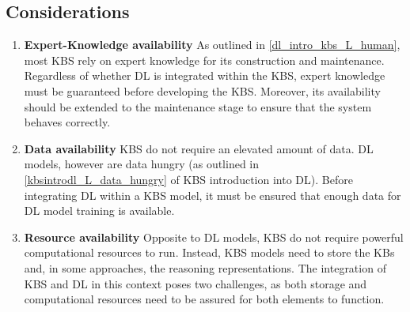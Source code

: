 \subsection{Considerations}
\begin{enumerate} [start=1,label={\bfseries C\arabic*.}]
    \item \textbf{Expert-Knowledge availability}\label{dlintrokbs_C_expert} As outlined in \ref{dl_intro_kbs_L_human}, most KBS rely on expert knowledge for its construction and maintenance. Regardless of whether DL is integrated within the KBS, expert knowledge must be guaranteed before developing the KBS. Moreover, its availability should be extended to the maintenance stage to ensure that the system behaves correctly.
    
    \item \textbf{Data availability}\label{dlintrokbs_C_data} KBS do not require an elevated amount of data. DL models, however are data hungry (as outlined in \ref{kbsintrodl_L_data_hungry} of KBS introduction into DL). Before integrating DL within a KBS model, it must be ensured that enough data for DL model training is available. 
    
    \item \textbf{Resource availability}\label{dlintrokbs_C_resource} Opposite to DL models, KBS do not require powerful computational resources to run. Instead, KBS models need to store the KBs and, in some approaches, the reasoning representations. The integration of KBS and DL in this context poses two challenges, as both storage and computational resources need to be assured for both elements to function.
\end{enumerate}
